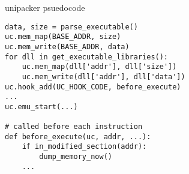 
\begin{frame}[fragile]{unipacker psuedocode}
\begin{Verbatim}[fontsize=\small]
data, size = parse_executable()
uc.mem_map(BASE_ADDR, size)
uc.mem_write(BASE_ADDR, data)
for dll in get_executable_libraries():
    uc.mem_map(dll['addr'], dll['size'])
    uc.mem_write(dll['addr'], dll['data'])
uc.hook_add(UC_HOOK_CODE, before_execute)
...
uc.emu_start(...)

# called before each instruction
def before_execute(uc, addr, ...):
    if in_modified_section(addr):
        dump_memory_now()
    ...
\end{Verbatim}
\end{frame}

